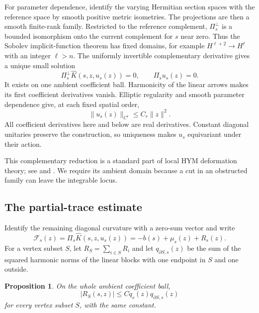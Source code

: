 \documentclass[11pt]{amsart}
\newtheorem{proposition}[theorem]{Proposition}
\theoremstyle{definition}
\theoremstyle{remark}
\newcommand{\cF}{\mathcal F}
\begin{document}
For parameter dependence, identify the varying Hermitian section spaces
with the reference space by smooth positive metric isometries. The
projections are then a smooth finite-rank family. Restricted to the reference
complement, $\Pi_s^\perp$ is a bounded isomorphism onto the current
complement for $s$ near zero. Thus the Sobolev implicit-function theorem
has fixed domains, for example $H^{\ell+2}\to H^\ell$ with an integer
$\ell>n$. The uniformly invertible complementary derivative gives a unique
small solution
\begin{equation}\label{eq:complement-equation}
 \Pi_s^\perp\widehat K(s,z,u_s(z))=0,\qquad
 \Pi_su_s(z)=0.
\end{equation}
It exists on one ambient coefficient ball. Harmonicity of the linear
arrows makes its first coefficient derivatives vanish. Elliptic regularity
and smooth parameter dependence give, at each fixed spatial order,
\begin{equation}\label{eq:u-estimate}
 \|u_s(z)\|_{C^r}\le C_r\|z\|^2.
\end{equation}
All coefficient derivatives here and below are real derivatives. Constant
diagonal unitaries preserve the construction, so uniqueness makes $u_s$
equivariant under their action.

This complementary reduction is a standard part of local HYM deformation
theory; see \cite[Propositions~3.1--3.2]{clarketipler2024} and
\cite[Lemma~4.1 and Proposition~4.2]{delloque2025}. We require its ambient
domain because a cut in an obstructed family can leave the integrable locus.

\subsection{The partial-trace estimate}
Identify the remaining diagonal curvature with a zero-sum vector and write
\begin{equation}\label{eq:residual}
 \cF_s(z)=\Pi_s\widehat K(s,z,u_s(z))=-b(s)+\mu_s(z)+R_s(z).
\end{equation}
For a vertex subset $S$, let $R_S=\sum_{i\in S}R_i$ and let
$q_{\partial S,s}(z)$ be the sum of the squared harmonic norms of the
linear blocks with one endpoint in $S$ and one outside.

\begin{proposition}\label{prop:cut-residual}
On the whole ambient coefficient ball,
\begin{equation}\label{eq:cut-residual}
 |R_S(s,z)|\le Cq_s(z)q_{\partial S,s}(z)
\end{equation}
for every vertex subset $S$, with the same constant.
\end{proposition}
\end{document}

